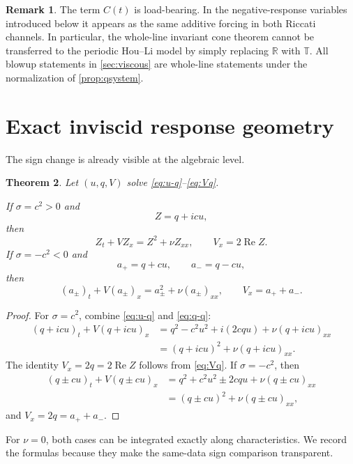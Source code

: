 \documentclass[11pt]{article}
\newtheorem{theorem}{Theorem}[section]
\theoremstyle{definition}
\newtheorem{remark}[theorem]{Remark}
\newcommand{\R}{\mathbb R}
\newcommand{\T}{\mathbb T}
\begin{document}
\begin{remark}\label{rem:domain}
The term $C(t)$ is load-bearing.  In the negative-response variables introduced below it appears as the same additive forcing in both Riccati channels.  In particular, the whole-line invariant cone theorem cannot be transferred to the periodic Hou--Li model by simply replacing $\R$ with $\T$.  All blowup statements in \cref{sec:viscous} are whole-line statements under the normalization of \cref{prop:qsystem}.
\end{remark}

\section{Exact inviscid response geometry}

The sign change is already visible at the algebraic level.

\begin{theorem}\label{thm:factor}
Let $(u,q,V)$ solve \eqref{eq:u-q}--\eqref{eq:Vq}.

If $\sigma=c^2>0$ and
\[
 Z=q+icu,
\]
then
\begin{equation}\label{eq:complex}
 Z_t+VZ_x=Z^2+\nu Z_{xx},
 \qquad V_x=2\operatorname{Re}Z.
\end{equation}
If $\sigma=-c^2<0$ and
\[
 a_+=q+cu,
 \qquad a_-=q-cu,
\]
then
\begin{equation}\label{eq:channels}
 (a_\pm)_t+V(a_\pm)_x=a_\pm^2+\nu(a_\pm)_{xx},
 \qquad V_x=a_++a_-.
\end{equation}
\end{theorem}

\begin{proof}
For $\sigma=c^2$, combine \eqref{eq:u-q} and \eqref{eq:q-q}:
\begin{align*}
 (q+icu)_t+V(q+icu)_x
 &=q^2-c^2u^2+i(2cqu)+\nu(q+icu)_{xx}\\
 &=(q+icu)^2+\nu(q+icu)_{xx}.
\end{align*}
The identity $V_x=2q=2\operatorname{Re}Z$ follows from \eqref{eq:Vq}.  If $\sigma=-c^2$, then
\begin{align*}
 (q\pm cu)_t+V(q\pm cu)_x
 &=q^2+c^2u^2\pm2cqu+\nu(q\pm cu)_{xx}\\
 &=(q\pm cu)^2+\nu(q\pm cu)_{xx},
\end{align*}
and $V_x=2q=a_++a_-$.
\end{proof}

For $\nu=0$, both cases can be integrated exactly along characteristics.  We record the formulas because they make the same-data sign comparison transparent.
\end{document}
